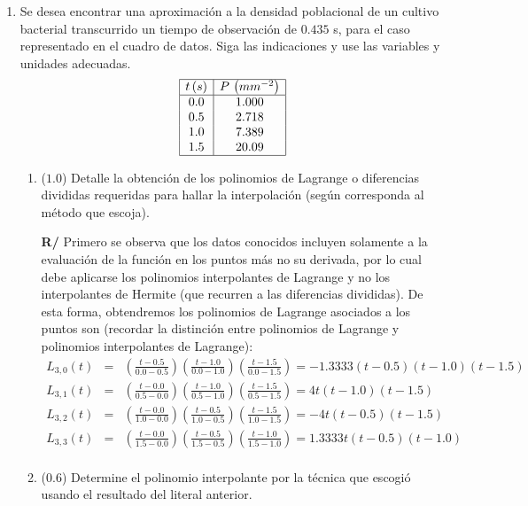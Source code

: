 \documentclass[12pt]{article}
\begin{document}
\vspace{-.5cm}
  \begin{enumerate}[leftmargin=*,widest=9]
    \item {\small Se desea encontrar una aproximación a la densidad poblacional de un cultivo bacterial transcurrido un tiempo de observación de \(0.435\) s, para el caso representado en el cuadro de datos. Siga las indicaciones y use las variables y unidades adecuadas.
\vspace*{-.7cm}
\[
\begin{array}{|c|c|}
\hline
t\, (s) & P\, \left(mm^{-2}\right) \\
\hline
0.0 & 1.000 \\
0.5 & 2.718 \\
1.0 & 7.389 \\
1.5 & 20.09 \\
\hline
\end{array}
\]
\vspace{-.9cm}
    }
   \begin{enumerate}[label=\alph*]
    \item (\(1.0\)) Detalle la obtención de los polinomios de Lagrange o diferencias divididas requeridas para hallar la interpolación (según corresponda al método que escoja).

\textbf{R/} Primero se observa que los datos conocidos incluyen solamente a la evaluación de la función en los puntos más no su derivada, por lo cual debe aplicarse los polinomios interpolantes de Lagrange y no los interpolantes de Hermite (que recurren a las diferencias divididas).
    De esta forma, obtendremos los polinomios de Lagrange asociados a los puntos son (recordar la distinción entre polinomios de Lagrange y polinomios interpolantes de Lagrange):
    \begin{eqnarray*}
    L_{3,0}(t) & = & \left(\frac{t-0.5}{0.0-0.5} \right) \left(\frac{t-1.0}{0.0-1.0} \right) \left(\frac{t-1.5}{0.0-1.5} \right) =  -1.3333(t-0.5)(t-1.0)(t-1.5) \\
    L_{3,1}(t) & = & \left(\frac{t-0.0}{0.5-0.0} \right) \left(\frac{t-1.0}{0.5-1.0} \right) \left(\frac{t-1.5}{0.5-1.5} \right) = 4t(t-1.0)(t-1.5) \\
    L_{3,2}(t) & = & \left(\frac{t-0.0}{1.0-0.0} \right) \left(\frac{t-0.5}{1.0-0.5} \right) \left(\frac{t-1.5}{1.0-1.5} \right) = -4t(t-0.5)(t-1.5) \\
    L_{3,3}(t) & = & \left(\frac{t-0.0}{1.5-0.0} \right) \left(\frac{t-0.5}{1.5-0.5} \right) \left(\frac{t-1.0}{1.5-1.0} \right) = 1.3333t(t-0.5)(t-1.0) \\
    \end{eqnarray*}
    \item (\(0.6\)) Determine el polinomio interpolante por la técnica que escogió usando el resultado del literal anterior.


\end{enumerate}
\end{enumerate}
\end{document}
